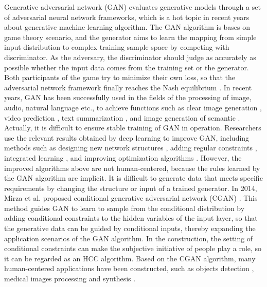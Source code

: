 \documentclass{bmcart}
\begin{document}
Generative adversarial network (GAN) \cite{Good} evaluates generative models through a set of adversarial neural network frameworks, which is a hot topic in recent years about generative machine learning algorithm. The GAN algorithm is bases on game theory scenario, and the generator aims to learn the mapping from simple input distribution to complex training sample space by competing with discriminator. As the adversary, the discriminator should judge as accurately as possible whether the input data comes from the training set or the generator. Both participants of the game try to minimize their own loss, so that the adversarial network framework finally reaches the Nash equilibrium \cite{WangK}. In recent years, GAN has been successfully used in the fields of the processing of image, audio, natural language etc., to achieve functions such as clear image generation \cite{Ledig,Kupyn}, video prediction \cite{ZhuL}, text summarization  \cite{Bhargava}, and image generation of semantic \cite{Johnson}. Actually, it is difficult to ensure stable training of GAN in operation. Researchers use the relevant results obtained by deep learning to improve GAN, including methods such as designing new network structures \cite{Radford}, adding regular constraints \cite{Ioffe}, integrated learning \cite{Tolstikhin}, and improving optimization algorithms \cite{1701.07875}. However, the improved algorithms above are not human-centered, because the rules learned by the GAN algorithm are implicit. It is difficult to generate data that meets specific requirements by changing the structure or input of a trained generator. In 2014, Mirza et al. proposed conditional generative adversarial network (CGAN) \cite{Mirza}. This method guides GAN to learn to sample from the conditional distribution by adding conditional constraints to the hidden variables of the input layer, so that the generative data can be guided by conditional inputs, thereby expanding the application scenarios of the GAN algorithm. In the construction, the setting of conditional constraints can make the subjective initiative of people play a role, so it can be regarded as an HCC algorithm. Based on the CGAN algorithm, many human-centered applications have been constructed, such as objects detection \cite{ZhuD}, medical images processing and synthesis \cite{Dar,YiX}.
\end{document}
